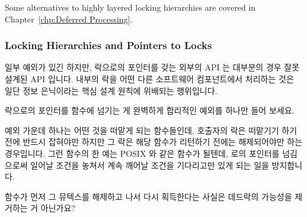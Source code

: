 Some alternatives to highly layered locking hierarchies are covered in
Chapter~\ref{chp:Deferred Processing}.
\fi

\subsubsection{Locking Hierarchies and Pointers to Locks}
\label{sec:locking:Locking Hierarchies and Pointers to Locks}

일부 예외가 있긴 하지만, 락으로의 포인터를 갖는 외부의 API 는 대부분의 경우
잘못 설계된 API 입니다.
내부의 락을 어떤 다른 소프트웨어 컴포넌트에서 처리하는 것은 일단 정보
은닉이라는 핵심 설계 원칙에 위배되는 행위입니다.

\QuickQuiz{}
	락으로의 포인터를 함수에 넘기는 게 완벽하게 합리적인 예외를 하나만 들어
	보세요.

\QuickQuizAnswer{
	락킹 도구들이죠, 당연히!

} \QuickQuizEnd

예외 가운데 하나는 어떤 것을 떠맡게 되는 함수들인데, 호출자의 락은 떠맡기기
하기 전에 반드시 잡혀야만 하지만 그 락은 해당 함수가 리턴하기 전에는
해제되어야만 하는 경우입니다.
그런 함수의 한 예는 POSIX  와 같은 함수가 될텐데,
 로의 포인터를 넘김으로써 일어날 조건을 놓쳐서 계속 깨어날
조건을 기다리고만 있게 되는 일을 방지합니다.

\QuickQuiz{}
	 함수가 먼저 그 뮤텍스를 해제하고 나서 다시
	획득한다는 사실은 데드락의 가능성을 제거하는 거 아닌가요?
	\iffalse

